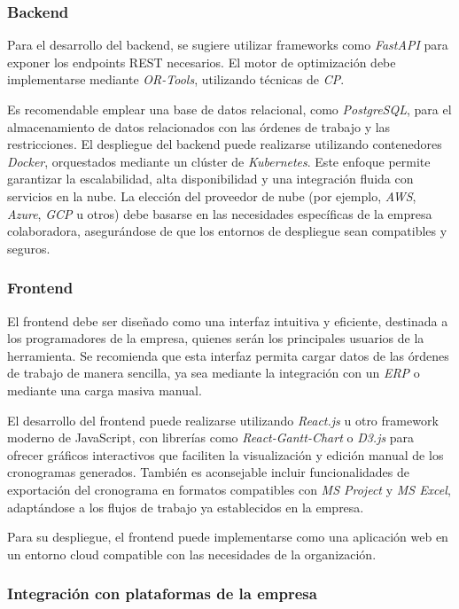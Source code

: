 \documentclass{article}
\begin{document}
\subsubsection{Backend}

Para el desarrollo del backend, se sugiere utilizar frameworks como \textit{FastAPI} para exponer los endpoints REST necesarios. El motor de optimización debe implementarse mediante \textit{OR-Tools}, utilizando técnicas de \textit{CP}.

Es recomendable emplear una base de datos relacional, como \textit{PostgreSQL}, para el almacenamiento de datos relacionados con las órdenes de trabajo y las restricciones. El despliegue del backend puede realizarse utilizando contenedores \textit{Docker}, orquestados mediante un clúster de \textit{Kubernetes}. Este enfoque permite garantizar la escalabilidad, alta disponibilidad y una integración fluida con servicios en la nube. La elección del proveedor de nube (por ejemplo, \textit{AWS}, \textit{Azure}, \textit{GCP} u otros) debe basarse en las necesidades específicas de la empresa colaboradora, asegurándose de que los entornos de despliegue sean compatibles y seguros.

\subsubsection{Frontend}

El frontend debe ser diseñado como una interfaz intuitiva y eficiente, destinada a los programadores de la empresa, quienes serán los principales usuarios de la herramienta. Se recomienda que esta interfaz permita cargar datos de las órdenes de trabajo de manera sencilla, ya sea mediante la integración con un \textit{ERP} o mediante una carga masiva manual.

El desarrollo del frontend puede realizarse utilizando \textit{React.js} u otro framework moderno de JavaScript, con librerías como \textit{React-Gantt-Chart} o \textit{D3.js} para ofrecer gráficos interactivos que faciliten la visualización y edición manual de los cronogramas generados. También es aconsejable incluir funcionalidades de exportación del cronograma en formatos compatibles con \textit{MS Project} y \textit{MS Excel}, adaptándose a los flujos de trabajo ya establecidos en la empresa.

Para su despliegue, el frontend puede implementarse como una aplicación web en un entorno cloud compatible con las necesidades de la organización.

\subsubsection{Integración con plataformas de la empresa}
\end{document}
